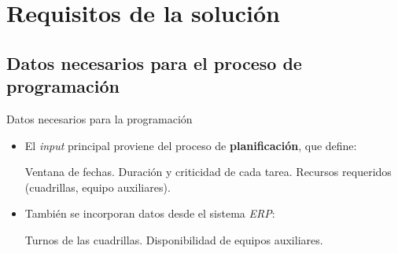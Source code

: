 \documentclass[pdfpagelabels=false, usepdftitle=false, aspectratio=169]{beamer}
\begin{document}


\section{Requisitos de la solución}

\subsection{Datos necesarios para el proceso de programación}

\begin{frame}{Datos necesarios para la programación}
\begin{itemize}
  \item El \textit{input} principal proviene del proceso de \textbf{planificación}, que define:
  \begin{itemize}
      \arrowitem Ventana de fechas.
      \arrowitem Duración y criticidad de cada tarea.
      \arrowitem Recursos requeridos (cuadrillas, equipo auxiliares).
  \end{itemize}
  \vfill
  \item También se incorporan datos desde el sistema \textit{ERP}:
  \begin{itemize}
      \arrowitem Turnos de las cuadrillas.
      \arrowitem Disponibilidad de equipos auxiliares.
  \end{itemize}
  \vfill
\end{itemize}
\vfill
\end{frame}
\end{document}

